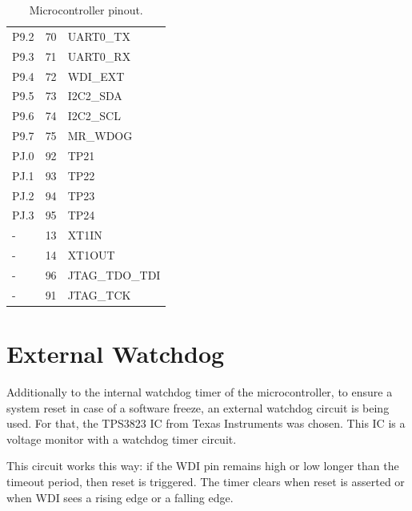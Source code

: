 \begin{table}[!h]
\begin{tabular}{lcl}
        P9.2              & 70                  & UART0\_TX             \\
        P9.3              & 71                  & UART0\_RX             \\
        P9.4              & 72                  & WDI\_EXT              \\
        P9.5              & 73                  & I2C2\_SDA             \\
        P9.6              & 74                  & I2C2\_SCL             \\
        P9.7              & 75                  & MR\_WDOG              \\
        \midrule
        PJ.0              & 92                  & TP21                  \\
        PJ.1              & 93                  & TP22                  \\
        PJ.2              & 94                  & TP23                  \\
        PJ.3              & 95                  & TP24                  \\
        \midrule
        -                 & 13                  & XT1IN                 \\
        -                 & 14                  & XT1OUT                \\
        -                 & 96                  & JTAG\_TDO\_TDI        \\
        -                 & 91                  & JTAG\_TCK             \\
        \bottomrule[1.5pt]
    \end{tabular}
    \caption{Microcontroller pinout.}
    \label{tab:mcu-pinout}
\end{table}

\section{External Watchdog}

Additionally to the internal watchdog timer of the microcontroller, to ensure a system reset in case of a software freeze, an external watchdog circuit is being used. For that, the TPS3823 IC from Texas Instruments was chosen. This IC is a voltage monitor with a watchdog timer circuit.

This circuit works this way: if the WDI pin remains high or low longer than the timeout period, then reset is triggered. The timer clears when reset is asserted or when WDI sees a rising edge or a falling edge.

